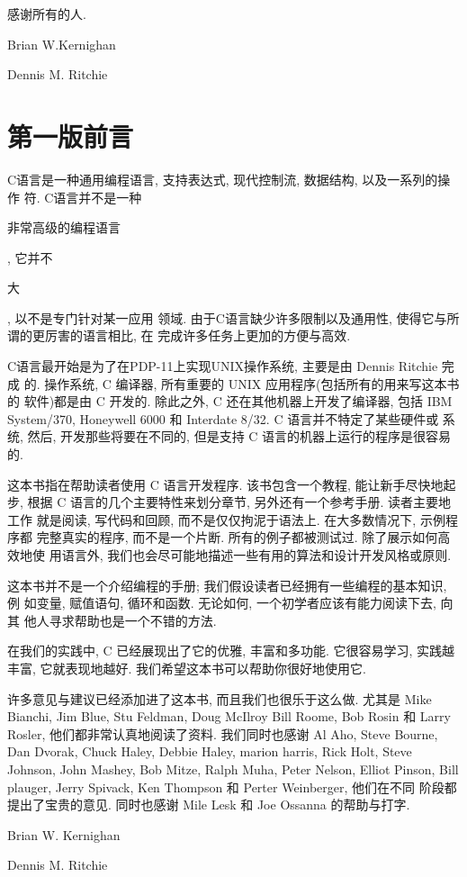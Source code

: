 感谢所有的人.
 
Brian W.Kernighan

Dennis M. Ritchie

\chapter{第一版前言}
C语言是一种通用编程语言, 支持表达式, 现代控制流, 数据结构, 以及一系列的操作
符. C语言并不是一种\begin{myquotation}非常高级的编程语言\end{myquotation}, 
它并不\begin{myquotation}大\end{myquotation}, 以不是专门针对某一应用
领域. 由于C语言缺少许多限制以及通用性, 使得它与所谓的更厉害的语言相比, 在
完成许多任务上更加的方便与高效.

C语言最开始是为了在PDP-11上实现UNIX操作系统, 主要是由 Dennis Ritchie 完成
的. 操作系统, C 编译器, 所有重要的 UNIX 应用程序(包括所有的用来写这本书的
软件)都是由 C 开发的. 除此之外, C 还在其他机器上开发了编译器, 包括 IBM
System/370, Honeywell 6000 和 Interdate 8/32. C 语言并不特定了某些硬件或
系统, 然后, 开发那些将要在不同的, 但是支持 C 语言的机器上运行的程序是很容易
的.

这本书指在帮助读者使用 C 语言开发程序. 该书包含一个教程, 能让新手尽快地起步,
根据 C 语言的几个主要特性来划分章节, 另外还有一个参考手册. 读者主要地工作
就是阅读, 写代码和回顾, 而不是仅仅拘泥于语法上. 在大多数情况下, 示例程序都
完整真实的程序, 而不是一个片断. 所有的例子都被测试过. 除了展示如何高效地使
用语言外, 我们也会尽可能地描述一些有用的算法和设计开发风格或原则.

这本书并不是一个介绍编程的手册; 我们假设读者已经拥有一些编程的基本知识, 例
如变量, 赋值语句, 循环和函数. 无论如何, 一个初学者应该有能力阅读下去, 向其
他人寻求帮助也是一个不错的方法.

在我们的实践中, C 已经展现出了它的优雅, 丰富和多功能. 它很容易学习, 实践越
丰富, 它就表现地越好. 我们希望这本书可以帮助你很好地使用它.

许多意见与建议已经添加进了这本书, 而且我们也很乐于这么做. 尤其是 Mike 
Bianchi, Jim Blue, Stu Feldman, Doug McIlroy Bill Roome, Bob Rosin 和 Larry
Rosler, 他们都非常认真地阅读了资料. 我们同时也感谢 Al Aho, Steve Bourne, 
Dan Dvorak, Chuck Haley, Debbie Haley, marion harris, Rick Holt, Steve 
Johnson, John Mashey, Bob Mitze, Ralph Muha, Peter Nelson, Elliot Pinson, 
Bill plauger, Jerry Spivack, Ken Thompson 和 Perter Weinberger, 他们在不同
阶段都提出了宝贵的意见. 同时也感谢 Mile Lesk 和 Joe Ossanna 的帮助与打字.

Brian W. Kernighan

Dennis M. Ritchie
